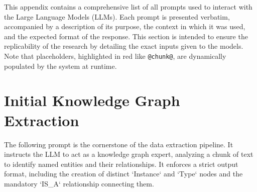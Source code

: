 This appendix contains a comprehensive list of all prompts used to interact with the Large Language Models (LLMs). Each prompt is presented verbatim, accompanied by a description of its purpose, the context in which it was used, and the expected format of the response. This section is intended to ensure the replicability of the research by detailing the exact inputs given to the models. Note that placeholders, highlighted in red like \texttt{@chunk@}, are dynamically populated by the system at runtime.

\section{Initial Knowledge Graph Extraction}

The following prompt is the cornerstone of the data extraction pipeline. It instructs the LLM to act as a knowledge graph expert, analyzing a chunk of text to identify named entities and their relationships. It enforces a strict output format, including the creation of distinct `Instance` and `Type` nodes and the mandatory `IS\_A` relationship connecting them.

